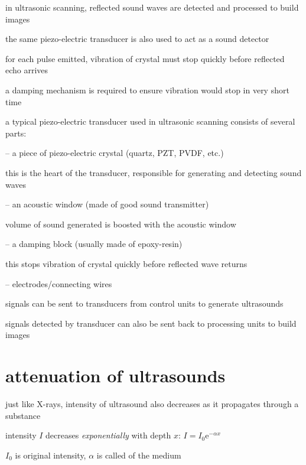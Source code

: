 \cmt in ultrasonic scanning, reflected sound waves are detected and processed to build images

the same piezo-electric transducer is also used to act as a sound detector

for each pulse emitted, vibration of crystal must stop quickly before reflected echo arrives

a damping mechanism is required to ensure vibration would stop in very short time

\cmt a typical piezo-electric transducer used in ultrasonic scanning consists of several parts:




\begin{compactitem}
	\item[--] a piece of piezo-electric crystal (quartz, PZT, PVDF, etc.)
	
	this is the heart of the transducer, responsible for generating and detecting sound waves

	\item[--] an acoustic window (made of good sound transmitter)
	
	volume of sound generated is boosted with the acoustic window
	
	\item[--] a damping block (usually made of epoxy-resin)
	
	this stops vibration of crystal quickly before reflected wave returns
	
	\item[--] electrodes/connecting wires
	
	signals can be sent to transducers from control units to generate ultrasounds
	
	signals detected by transducer can also be sent back to processing units to build images
	
	
\end{compactitem}

\section{attenuation of ultrasounds}

just like X-rays, intensity of ultrasound also decreases as it propagates through a substance

intensity $I$ decreases \emph{exponentially} with depth $x$: $\boxed{I = I_0 \mathrm{e}^{-\alpha x}}$

$I_0$ is original intensity, $\alpha$ is called  of the medium

